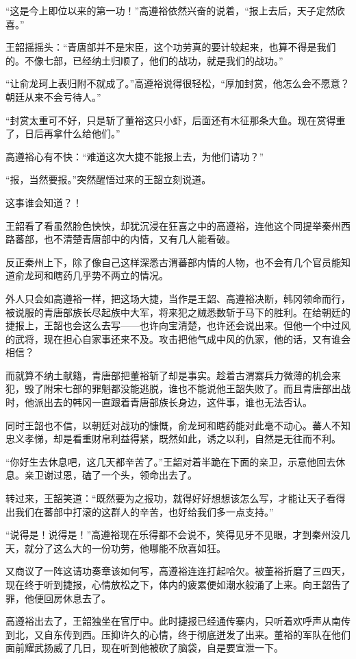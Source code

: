 “这是今上即位以来的第一功！”高遵裕依然兴奋的说着，“报上去后，天子定然欣喜。”

王韶摇摇头：“青唐部并不是宋臣，这个功劳真的要计较起来，也算不得是我们的。不像七部，已经纳土归顺了，他们的战功，就是我们的战功。”

“让俞龙珂上表归附不就成了。”高遵裕说得很轻松，“厚加封赏，他怎么会不愿意？朝廷从来不会亏待人。”

“封赏太重可不好，只是斩了董裕这只小虾，后面还有木征那条大鱼。现在赏得重了，日后再拿什么给他们。”

高遵裕心有不快：“难道这次大捷不能报上去，为他们请功？”

“报，当然要报。”突然醒悟过来的王韶立刻说道。

这事谁会知道？！

王韶看了看虽然脸色怏怏，却犹沉浸在狂喜之中的高遵裕，连他这个同提举秦州西路蕃部，也不清楚青唐部中的内情，又有几人能看破。

反正秦州上下，除了像自己这样深悉古渭蕃部内情的人物，也不会有几个官员能知道俞龙珂和瞎药几乎势不两立的情况。

外人只会如高遵裕一样，把这场大捷，当作是王韶、高遵裕决断，韩冈领命而行，被说服的青唐部族长尽起族中大军，将来犯之贼悉数斩于马下的胜利。在给朝廷的捷报上，王韶也会这么去写——也许向宝清楚，也许还会说出来。但他一个中过风的武将，现在担心自家事还来不及。攻击把他气成中风的仇家，他的话，又有谁会相信？

而就算不纳土献籍，青唐部把董裕斩了却是事实。趁着古渭寨兵力微薄的机会来犯，毁了附宋七部的罪魁都没能逃脱，谁也不能说他王韶失败了。而且青唐部出战时，他派出去的韩冈一直跟着青唐部族长身边，这件事，谁也无法否认。

同时王韶也不信，以朝廷对战功的慷慨，俞龙珂和瞎药能对此毫不动心。蕃人不知忠义孝悌，却是看重财帛利益得紧，既然如此，诱之以利，自然是无往而不利。

“你好生去休息吧，这几天都辛苦了。”王韶对着半跪在下面的亲卫，示意他回去休息。亲卫谢过恩，磕了一个头，领命出去了。

转过来，王韶笑道：“既然要为之报功，就得好好想想该怎么写，才能让天子看得出我们在蕃部中打滚的这群人的辛苦，也好给我们多一点支持。”

“说得是！说得是！”高遵裕现在乐得都不会说不，笑得见牙不见眼，才到秦州没几天，就分了这么大的一份功劳，他哪能不欣喜如狂。

又商议了一阵这请功奏章该如何写，高遵裕连连打起哈欠。被董裕折磨了三四天，现在终于听到捷报，心情放松之下，体内的疲累便如潮水般涌了上来。向王韶告了罪，他便回房休息去了。

高遵裕出去了，王韶独坐在官厅中。此时捷报已经通传寨内，只听着欢呼声从南传到北，又自东传到西。压抑许久的心情，终于彻底迸发了出来。董裕的军队在他们面前耀武扬威了几日，现在听到他被砍了脑袋，自是要宣泄一下。


